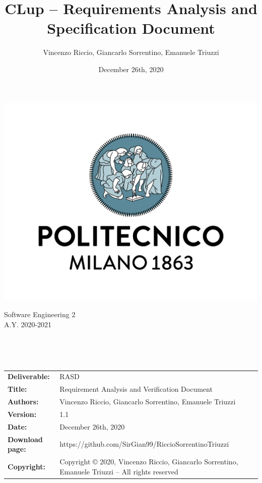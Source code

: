\documentclass[a4paper,oneside,11pt]{book}   %
\title{\LARGE{CLup -- Requirements Analysis and \newline Specification Document}}
\author{Vincenzo Riccio, Giancarlo Sorrentino, Emanuele Triuzzi}
\date{December 26th, 2020}
\begin{document}
\begin{titlingpage} 
    \begin{center}
        \includegraphics[height=0.52\linewidth]{pictures/polimi}\\ %
        \begin{large}
            Software Engineering 2 \\
            A.Y. 2020-2021\\
        \end{large}
        \vspace{4cm} %
        \begin{large} 
            \textbf{\thetitle} \\
        \end{large}
        \vspace{0.7cm}
        \theauthor\\
        \vspace{7.3cm} %
        \thedate
    \end{center}
\end{titlingpage}

\newpage
\begin{table}[H]
    \begin{tabu} to \textwidth { X[0.3,r,p] X[0.7,l,p] }
        \hline
        \textbf{Deliverable:}   & RASD\\
        \textbf{Title:}         & Requirement Analysis and Verification Document \\
        \textbf{Authors:}       & Vincenzo Riccio, Giancarlo Sorrentino, \newline Emanuele Triuzzi \\
        \textbf{Version:}       & 1.1 \\ 
        \textbf{Date:}          & December 26th, 2020 \\
        \textbf{Download page:} & https://github.com/SirGian99/RiccioSorrentinoTriuzzi \\
        \textbf{Copyright:}     & Copyright © 2020, Vincenzo Riccio, Giancarlo Sorrentino, Emanuele Triuzzi -- All rights reserved \\
        \hline
    \end{tabu}
\end{table}
\end{document}
